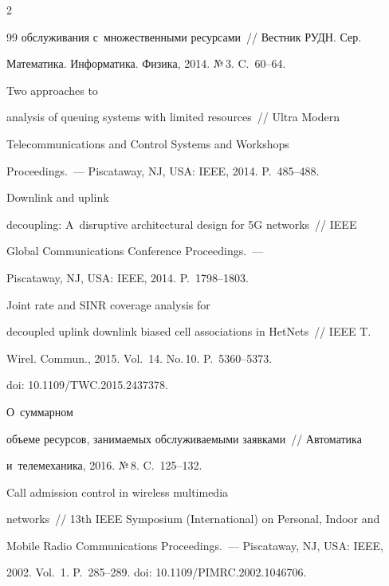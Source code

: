 \begin{multicols}{2}
{{\begin{thebibliography}{99}
обслуживания с~множественными ресурсами~// Вестник РУДН. Сер. 

Математика. Информатика. Физика, 2014. №\,3. C.~60--64.


 Two approaches to 

analysis of queuing systems with limited resources~// Ultra Modern 

Telecommunications and Control Systems and Workshops  

Proceedings.~--- Piscataway, NJ, USA: IEEE, 2014. P.~485--488. 




 Downlink and uplink 

decoupling: A~disruptive architectural design for 5G networks~// IEEE 

Global Communications Conference Proceedings.~--- 

Piscataway, NJ, USA: IEEE, 2014. P.~1798--1803.




 Joint rate and SINR coverage analysis for 

decoupled uplink downlink biased cell associations in HetNets~// IEEE T. 

Wirel. Commun., 2015. Vol.~14. No.\,10. P.~5360--5373.

doi: 10.1109/TWC.2015.2437378.




 О~суммарном 

объеме ресурсов, занимаемых обслуживаемыми заявками~// Автоматика 

и~телемеханика, 2016. №\,8. C.~125--132.


 Call admission control in wireless multimedia 

networks~// 13th IEEE Symposium (International) on Personal, Indoor and 

Mobile Radio Communications Proceedings.~--- Piscataway, NJ, USA: IEEE, 

2002. Vol.~1. P.~285--289. doi: 10.1109/PIMRC.2002.1046706.



\end{thebibliography}}}
\end{multicols}
